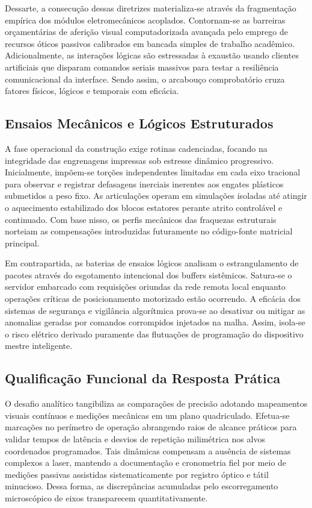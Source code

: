 Dessarte, a consecução dessas diretrizes materializa-se através da fragmentação empírica dos módulos eletromecânicos acoplados. Contornam-se as barreiras orçamentárias de aferição visual computadorizada avançada pelo emprego de recursos óticos passivos calibrados em bancada simples de trabalho acadêmico. Adicionalmente, as interações lógicas são estressadas à exaustão usando clientes artificiais que disparam comandos seriais massivos para testar a resiliência comunicacional da interface. Sendo assim, o arcabouço comprobatório cruza fatores físicos, lógicos e temporais com eficácia.

\subsection{Ensaios Mecânicos e Lógicos Estruturados}

A fase operacional da construção exige rotinas cadenciadas, focando na integridade das engrenagens impressas sob estresse dinâmico progressivo. Inicialmente, impõem-se torções independentes limitadas em cada eixo tracional para observar e registrar defasagens inerciais inerentes aos engates plásticos submetidos a peso fixo. As articulações operam em simulações isoladas até atingir o aquecimento estabilizado dos blocos estatores perante atrito controlável e continuado. Com base nisso, os perfis mecânicos das fraquezas estruturais norteiam as compensações introduzidas futuramente no código-fonte matricial principal.

Em contrapartida, as baterias de ensaios lógicos analisam o estrangulamento de pacotes através do esgotamento intencional dos buffers sistêmicos. Satura-se o servidor embarcado com requisições oriundas da rede remota local enquanto operações críticas de posicionamento motorizado estão ocorrendo. A eficácia dos sistemas de segurança e vigilância algorítmica prova-se ao desativar ou mitigar as anomalias geradas por comandos corrompidos injetados na malha. Assim, isola-se o risco elétrico derivado puramente das flutuações de programação do dispositivo mestre inteligente.

\subsection{Qualificação Funcional da Resposta Prática}

O desafio analítico tangibiliza as comparações de precisão adotando mapeamentos visuais contínuos e medições mecânicas em um plano quadriculado. Efetua-se marcações no perímetro de operação abrangendo raios de alcance práticos para validar tempos de latência e desvios de repetição milimétrica nos alvos coordenados programados. Tais dinâmicas compensam a ausência de sistemas complexos a laser, mantendo a documentação e cronometria fiel por meio de medições passivas assistidas sistematicamente por registro óptico e tátil minucioso. Dessa forma, as discrepâncias acumuladas pelo escorregamento microscópico de eixos transparecem quantitativamente.

